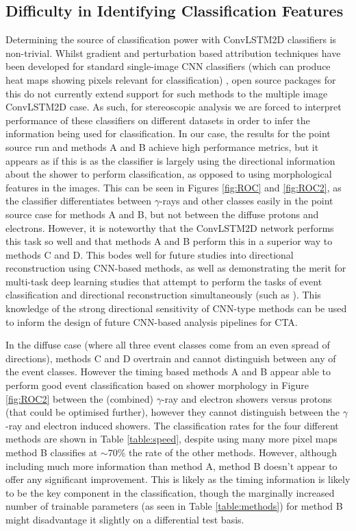 \subsection{Difficulty in Identifying Classification Features}
Determining the source of classification power with ConvLSTM2D classifiers is non-trivial. Whilst gradient and perturbation based attribution techniques have been developed for standard single-image CNN classifiers (which can produce heat maps showing pixels relevant for classification) \cite{deepexplain}, open source packages for this do not currently extend support for such methods to the multiple image ConvLSTM2D case. As such, for stereoscopic analysis we are forced to interpret performance of these classifiers on different datasets in order to infer the information being used for classification. In our case, the results for the point source run and methods A and B achieve high performance metrics, but it appears as if this is as the classifier is largely using the directional information about the shower to perform classification, as opposed to using morphological features in the images. This can be seen in Figures \ref{fig:ROC} and \ref{fig:ROC2}, as the classifier differentiates between $\gamma$-rays and other classes easily in the point source case for methods A and B, but not between the diffuse protons and electrons. However, it is noteworthy that the ConvLSTM2D network performs this task so well and that methods A and B perform this in a superior way to methods C and D. This bodes well for future studies into directional reconstruction using CNN-based methods, as well as demonstrating the merit for multi-task deep learning studies that attempt to perform the tasks of event classification and directional reconstruction simultaneously (such as \cite{jacquemont}). This knowledge of the strong directional sensitivity of CNN-type methods can be used to inform the design of future CNN-based analysis pipelines for CTA.

In the diffuse case (where all three event classes come from an even spread of directions), methods C and D overtrain and cannot distinguish between any of the event classes. However the timing based methods A and B appear able to perform good event classification based on shower morphology in Figure \ref{fig:ROC2} between the (combined) $\gamma$-ray and electron showers versus protons (that could be optimised further), however they cannot distinguish between the $\gamma$-ray and electron induced showers. The classification rates for the four different methods are shown in Table \ref{table:speed}, despite using many more pixel maps method B classifies at $\sim 70\%$ the rate of the other methods. However, although including much more information than method A, method B doesn't appear to offer any significant improvement. This is likely as the timing information is likely to be the key component in the classification, though the marginally increased number of trainable parameters (as seen in Table \ref{table:methods}) for method B might disadvantage it slightly on a differential test basis.

